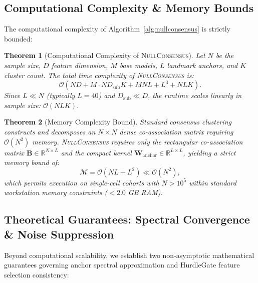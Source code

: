 \documentclass[preprint,12pt]{elsarticle}
\newtheorem{theorem}{Theorem}
\begin{document}
\subsection{Computational Complexity \& Memory Bounds}
The computational complexity of Algorithm~\ref{alg:nullconsensus} is strictly bounded:
\begin{theorem}[Computational Complexity of \textsc{NullConsensus}]
Let $N$ be the sample size, $D$ feature dimension, $M$ base models, $L$ landmark anchors, and $K$ cluster count. The total time complexity of \textsc{NullConsensus} is:
\begin{equation}
    \mathcal{O}\left(N D + M \cdot N D_{\text{sub}} K + M N L + L^3 + N L K\right).
\end{equation}
Since $L \ll N$ (typically $L=40$) and $D_{\text{sub}} \ll D$, the runtime scales linearly in sample size: $\mathcal{O}(N L K)$.
\end{theorem}

\begin{theorem}[Memory Complexity Bound]
Standard consensus clustering constructs and decomposes an $N \times N$ dense co-association matrix requiring $\mathcal{O}(N^2)$ memory. \textsc{NullConsensus} requires only the rectangular co-association matrix $\mathbf{B} \in \mathbb{R}^{N \times L}$ and the compact kernel $\mathbf{W}_{\text{anchor}} \in \mathbb{R}^{L \times L}$, yielding a strict memory bound of:
\begin{equation}
    \mathcal{M} = \mathcal{O}\left(N L + L^2\right) \ll \mathcal{O}(N^2),
\end{equation}
which permits execution on single-cell cohorts with $N > 10^5$ within standard workstation memory constraints ($< 2.0$ GB RAM).
\end{theorem}

\subsection{Theoretical Guarantees: Spectral Convergence \& Noise Suppression}

Beyond computational scalability, we establish two non-asymptotic mathematical guarantees governing anchor spectral approximation and HurdleGate feature selection consistency:
\end{document}
